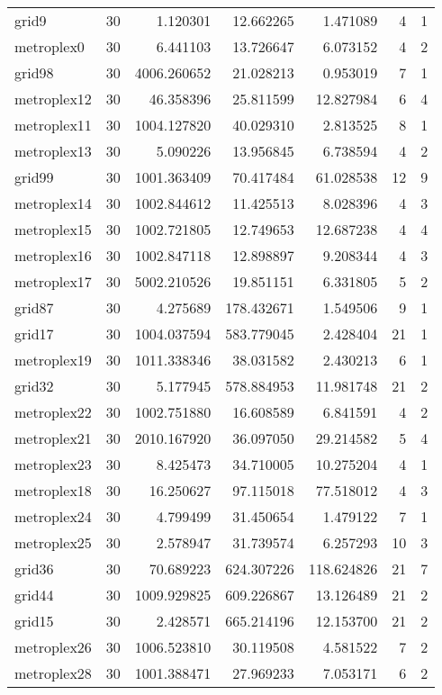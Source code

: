 \begin{longtable}{|l|r|r|r|r|r|r|}
grid9 & 30 & 1.120301 & 12.662265 & 1.471089 & 4 & 1 \\
metroplex0 & 30 & 6.441103 & 13.726647 & 6.073152 & 4 & 2 \\
grid98 & 30 & 4006.260652 & 21.028213 & 0.953019 & 7 & 1 \\
metroplex12 & 30 & 46.358396 & 25.811599 & 12.827984 & 6 & 4 \\
metroplex11 & 30 & 1004.127820 & 40.029310 & 2.813525 & 8 & 1 \\
metroplex13 & 30 & 5.090226 & 13.956845 & 6.738594 & 4 & 2 \\
grid99 & 30 & 1001.363409 & 70.417484 & 61.028538 & 12 & 9 \\
metroplex14 & 30 & 1002.844612 & 11.425513 & 8.028396 & 4 & 3 \\
metroplex15 & 30 & 1002.721805 & 12.749653 & 12.687238 & 4 & 4 \\
metroplex16 & 30 & 1002.847118 & 12.898897 & 9.208344 & 4 & 3 \\
metroplex17 & 30 & 5002.210526 & 19.851151 & 6.331805 & 5 & 2 \\
grid87 & 30 & 4.275689 & 178.432671 & 1.549506 & 9 & 1 \\
grid17 & 30 & 1004.037594 & 583.779045 & 2.428404 & 21 & 1 \\
metroplex19 & 30 & 1011.338346 & 38.031582 & 2.430213 & 6 & 1 \\
grid32 & 30 & 5.177945 & 578.884953 & 11.981748 & 21 & 2 \\
metroplex22 & 30 & 1002.751880 & 16.608589 & 6.841591 & 4 & 2 \\
metroplex21 & 30 & 2010.167920 & 36.097050 & 29.214582 & 5 & 4 \\
metroplex23 & 30 & 8.425473 & 34.710005 & 10.275204 & 4 & 1 \\
metroplex18 & 30 & 16.250627 & 97.115018 & 77.518012 & 4 & 3 \\
metroplex24 & 30 & 4.799499 & 31.450654 & 1.479122 & 7 & 1 \\
metroplex25 & 30 & 2.578947 & 31.739574 & 6.257293 & 10 & 3 \\
grid36 & 30 & 70.689223 & 624.307226 & 118.624826 & 21 & 7 \\
grid44 & 30 & 1009.929825 & 609.226867 & 13.126489 & 21 & 2 \\
grid15 & 30 & 2.428571 & 665.214196 & 12.153700 & 21 & 2 \\
metroplex26 & 30 & 1006.523810 & 30.119508 & 4.581522 & 7 & 2 \\
metroplex28 & 30 & 1001.388471 & 27.969233 & 7.053171 & 6 & 2 \\

\end{longtable}
